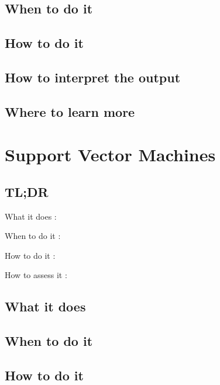 \documentclass[
]{book}
\begin{document}
\hypertarget{when-to-do-it-19}{%
\section{When to do it}\label{when-to-do-it-19}}

\hypertarget{how-to-do-it-19}{%
\section{How to do it}\label{how-to-do-it-19}}

\hypertarget{how-to-interpret-the-output-19}{%
\section{How to interpret the output}\label{how-to-interpret-the-output-19}}

\hypertarget{where-to-learn-more-19}{%
\section{Where to learn more}\label{where-to-learn-more-19}}

\hypertarget{support-vector-machines}{%
\chapter{Support Vector Machines}\label{support-vector-machines}}

\hypertarget{tldr-20}{%
\section{TL;DR}\label{tldr-20}}

What it does
:

When to do it
:

How to do it
:

How to assess it
:

\hypertarget{what-it-does-20}{%
\section{What it does}\label{what-it-does-20}}

\hypertarget{when-to-do-it-20}{%
\section{When to do it}\label{when-to-do-it-20}}

\hypertarget{how-to-do-it-20}{%
\section{How to do it}\label{how-to-do-it-20}}
\end{document}
